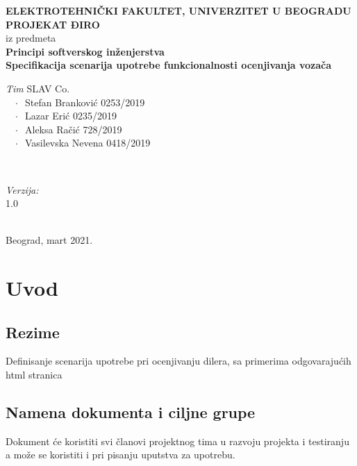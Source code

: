 \documentclass[12pt]{article}
\begin{document}
    \renewcommand{\labelenumii}{\arabic{enumi}.\arabic{enumii}}
	\begin{titlepage}  
		\center
		\textbf{ \LARGE ELEKTROTEHNIČKI FAKULTET, UNIVERZITET U BEOGRADU } \\[4cm]
		\textbf{ \Large PROJEKAT ĐIRO\texttrademark} \\[0.3cm]
		iz predmeta \\[0.3cm]
		\textbf{ \Large Principi softverskog inženjerstva} \\[0.7cm]
		{ \huge \bfseries Specifikacija scenarija upotrebe funkcionalnosti ocenjivanja vozača } \\[6cm]
		

		\begin{minipage}{0.5\textwidth}
			\begin{flushleft}
				\large
				\emph{Tim} SLAV Co. \\
			     $\;\;\; \cdot \;\;$Stefan Branković  0253/2019\\
			     $\;\;\; \cdot \;\;$Lazar Erić 0235/2019\\
			     $\;\;\; \cdot \;\;$Aleksa Račić 728/2019\\
			     $\;\;\; \cdot \;\;$Vasilevska Nevena 0418/2019
			\end{flushleft}
		\end{minipage}
		~
		\begin{minipage}{0.4\textwidth}
			\begin{flushright}
				\large
				\emph{Verzija:} \\
				1.0
			\end{flushright}
		\end{minipage} \\[2cm]
		\enlargethispage{4\baselineskip}
		{ \large Beograd, mart 2021. }
		\vfill
	\end{titlepage}
\pagebreak
\tableofcontents
\pagebreak



\section{Uvod}
\subsection{Rezime}
Definisanje scenarija upotrebe pri ocenjivanju dilera, sa primerima odgovarajućih html stranica
\subsection{Namena dokumenta i ciljne grupe}
Dokument će koristiti svi članovi projektnog tima u razvoju projekta i testiranju a može se koristiti i pri pisanju uputstva za
upotrebu.
\end{document}
